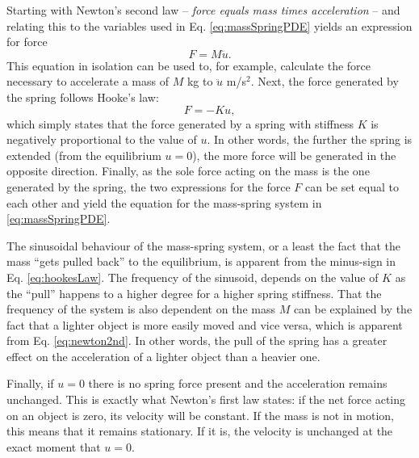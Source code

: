Starting with Newton's second law -- \textit{force equals mass times acceleration} -- and relating this to the variables used in Eq. \eqref{eq:massSpringPDE} yields an expression for force
\begin{equation}\label{eq:newton2nd}
    F = M\ddot u.
\end{equation}
This equation in isolation can be used to, for example, calculate the force necessary to accelerate a mass of $M$ kg to $\ddot u$ m/s$^2$. Next, the force generated by the spring follows Hooke's law:
\begin{equation}\label{eq:hookesLaw}
    F = -Ku,
\end{equation} 
which simply states that the force generated by a spring with stiffness $K$ is negatively proportional to the value of $u$. In other words, the further the spring is extended (from the equilibrium $u=0$), the more force will be generated in the opposite direction. Finally, as the sole force acting on the mass is the one generated by the spring, the two expressions for the force $F$ can be set equal to each other and yield the equation for the mass-spring system in \eqref{eq:massSpringPDE}. 

The sinusoidal behaviour of the mass-spring system, or a least the fact that the mass ``gets pulled back'' to the equilibrium, is apparent from the minus-sign in Eq. \eqref{eq:hookesLaw}. The frequency of the sinusoid, depends on the value of $K$ as the ``pull'' happens to a higher degree for a higher spring stiffness. 
That the frequency of the system is also dependent on the mass $M$ can be explained by the fact that a lighter object is more easily moved and vice versa, which is apparent from Eq. \eqref{eq:newton2nd}. In other words, the pull of the spring has a greater effect on the acceleration of a lighter object than a heavier one. 



Finally, if $u = 0$ there is no spring force present and the acceleration remains unchanged. This is exactly what Newton's first law states: if the net force acting on an object is zero, its velocity will be constant. If the mass is not in motion, this means that it remains stationary. If it is, the velocity is unchanged at the exact moment that $u=0$.


